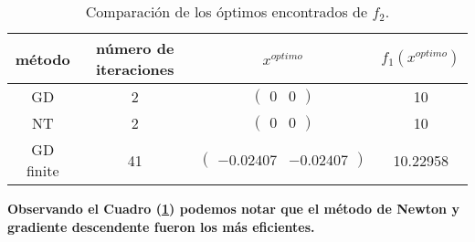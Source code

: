 \documentclass[11pt,letterpaper]{article}
\begin{document}
\begin{enumerate}
\begin{table}[h]
\centering
\begin{tabular}{c|c|c|c}
\hline \hline
método &número de iteraciones &$x^{optimo}$ & $f_1(x^{optimo})$ \\ \hline \hline
GD &2 &$\begin{pmatrix}
0 & 0
\end{pmatrix}$ & 10\\
NT &2&$\begin{pmatrix}
0 & 0
\end{pmatrix}$ & 10\\
GD finite & 41 &$\begin{pmatrix}
-0.02407 & -0.02407
\end{pmatrix}$ & 10.22958 \\ \hline \hline
\end{tabular}
\caption{Comparación de los óptimos encontrados de $f_2$.}\label{funcion2}
\end{table}
\textbf{Observando el Cuadro (\ref{funcion2}) podemos notar que el método de Newton y gradiente descendente fueron los más eficientes.}



\end{enumerate}
\end{document}
